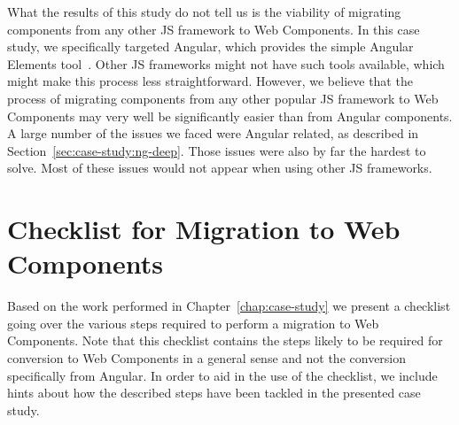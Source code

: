 What the results of this study do not tell us is the viability of migrating components from any other JS framework to Web Components. In this case study, we specifically targeted Angular, which provides the simple Angular Elements tool~. Other JS frameworks might not have such tools available, which might make this process less straightforward. However, we believe that the process of migrating components from any other popular JS framework to Web Components may very well be significantly easier than from Angular components. A large number of the issues we faced were Angular related, as described in Section~\ref{sec:case-study:ng-deep}. Those issues were also by far the hardest to solve. Most of these issues would not appear when using other JS frameworks.

\section{Checklist for Migration to Web Components}
Based on the work performed in Chapter~\ref{chap:case-study} we present a checklist going over the various steps required to perform a migration to Web Components. Note that this checklist contains the steps likely to be required for conversion to Web Components in a general sense and not the conversion specifically from Angular. In order to aid in the use of the checklist, we include hints about how the described steps have been tackled in the presented case study.

